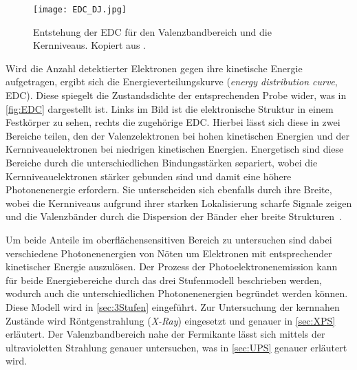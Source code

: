         \begin{figure}
            \centering
            \texttt{[image: EDC\_DJ.jpg]}
            \caption{Entstehung der EDC für den Valenzbandbereich und die Kernniveaus.
            Kopiert aus \cite{oura_surface_2003}.}
            \label{fig:EDC}
        \end{figure}
        Wird die Anzahl detektierter Elektronen gegen ihre kinetische Energie aufgetragen, ergibt sich die Energieverteilungskurve (\textit{energy distribution curve}, EDC).
        Diese spiegelt die Zustandsdichte der entsprechenden Probe wider, was in \autoref{fig:EDC} dargestellt ist.        
        Links im Bild ist die elektronische Struktur in einem Festkörper zu sehen, rechts die zugehörige EDC.
        Hierbei lässt sich diese in zwei Bereiche teilen, den der Valenzelektronen bei hohen kinetischen Energien und der Kernniveauelektronen bei niedrigen kinetischen Energien.
        Energetisch sind diese Bereiche durch die unterschiedlichen Bindungsstärken separiert, wobei die Kernniveauelektronen stärker gebunden sind und damit eine höhere Photonenenergie erfordern.
        Sie unterscheiden sich ebenfalls durch ihre Breite, wobei die Kernniveaus aufgrund ihrer starken Lokalisierung scharfe Signale zeigen und die Valenzbänder durch die Dispersion der Bänder eher breite Strukturen~\cite{Hüfner}.

        Um beide Anteile im oberflächensensitiven Bereich zu untersuchen sind dabei verschiedene Photonenenergien von Nöten um Elektronen mit entsprechender kinetischer Energie auszulösen.
        Der Prozess der Photoelektronenemission kann für beide Energiebereiche durch das drei Stufenmodell beschrieben werden, wodurch auch die unterschiedlichen Photonenenergien begründet werden können.
        Diese Modell wird in \autoref{sec:3Stufen} eingeführt.
        Zur Untersuchung der kernnahen Zustände wird Röntgenstrahlung (\textit{X-Ray}) eingesetzt und genauer in \autoref{sec:XPS} erläutert.
        Der Valenzbandbereich nahe der Fermikante lässt sich mittels der ultravioletten Strahlung genauer untersuchen, was in \autoref{sec:UPS} genauer erläutert wird.

